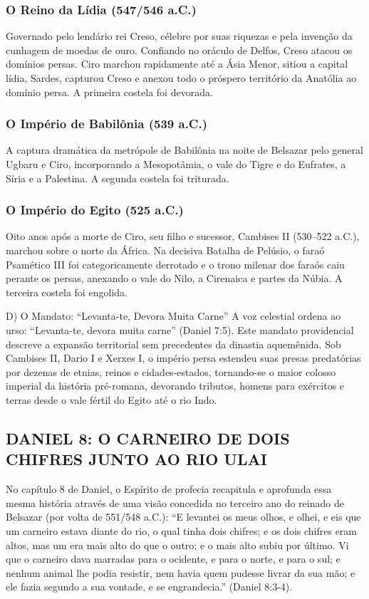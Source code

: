\documentclass[11pt,a4paper,openany]{book}
\begin{document}
\subsubsection*{O Reino da Lídia (547/546 a.C.)}
Governado pelo lendário rei Creso, célebre por suas riquezas e pela invenção da cunhagem de moedas de ouro. Confiando no oráculo de Delfos, Creso atacou os domínios persas. Ciro marchou rapidamente até a Ásia Menor, sitiou a capital lídia, Sardes, capturou Creso e anexou todo o próspero território da Anatólia ao domínio persa. A primeira costela foi devorada.

\subsubsection*{O Império de Babilônia (539 a.C.)}
A captura dramática da metrópole de Babilônia na noite de Belsazar pelo general Ugbaru e Ciro, incorporando a Mesopotâmia, o vale do Tigre e do Eufrates, a Síria e a Palestina. A segunda costela foi triturada.

\subsubsection*{O Império do Egito (525 a.C.)}
Oito anos após a morte de Ciro, seu filho e sucessor, Cambises II (530–522 a.C.), marchou sobre o norte da África. Na decisiva Batalha de Pelúsio, o faraó Psamético III foi categoricamente derrotado e o trono milenar dos faraós caiu perante os persas, anexando o vale do Nilo, a Cirenaica e partes da Núbia. A terceira costela foi engolida.

D) O Mandato: ``Levanta-te, Devora Muita Carne''
A voz celestial ordena ao urso: ``Levanta-te, devora muita carne'' (Daniel 7:5). Este mandato providencial descreve a expansão territorial sem precedentes da dinastia aquemênida. Sob Cambises II, Dario I e Xerxes I, o império persa estendeu suas presas predatórias por dezenas de etnias, reinos e cidades-estados, tornando-se o maior colosso imperial da história pré-romana, devorando tributos, homens para exércitos e terras desde o vale fértil do Egito até o rio Indo.



\subsection{DANIEL 8: O CARNEIRO DE DOIS CHIFRES JUNTO AO RIO ULAI}


No capítulo 8 de Daniel, o Espírito de profecia recapitula e aprofunda essa mesma história através de uma visão concedida no terceiro ano do reinado de Belsazar (por volta de 551/548 a.C.):
``E levantei os meus olhos, e olhei, e eis que um carneiro estava diante do rio, o qual tinha dois chifres; e os dois chifres eram altos, mas um era mais alto do que o outro; e o mais alto subiu por último. Vi que o carneiro dava marradas para o ocidente, e para o norte, e para o sul; e nenhum animal lhe podia resistir, nem havia quem pudesse livrar da sua mão; e ele fazia segundo a sua vontade, e se engrandecia.'' (Daniel 8:3-4).
\end{document}
